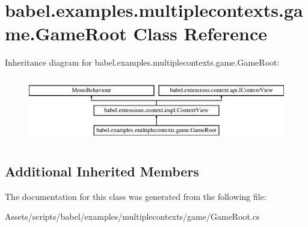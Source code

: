\hypertarget{classbabel_1_1examples_1_1multiplecontexts_1_1game_1_1_game_root}{\section{babel.\-examples.\-multiplecontexts.\-game.\-Game\-Root Class Reference}
\label{classbabel_1_1examples_1_1multiplecontexts_1_1game_1_1_game_root}
}
Inheritance diagram for babel.\-examples.\-multiplecontexts.\-game.\-Game\-Root\-:\begin{figure}[H]
\begin{center}
\leavevmode
\includegraphics[height=2.857143cm]{classbabel_1_1examples_1_1multiplecontexts_1_1game_1_1_game_root}
\end{center}
\end{figure}
\subsection*{Additional Inherited Members}


The documentation for this class was generated from the following file\-:\begin{DoxyCompactItemize}
\item 
Assets/scripts/babel/examples/multiplecontexts/game/Game\-Root.\-cs\end{DoxyCompactItemize}
